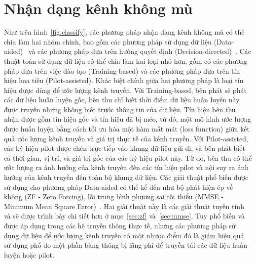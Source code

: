 \section{Nhận dạng kênh không mù}
Như trên hình~\ref{fig:classify}, các phương pháp nhận dạng kênh không mù có thể chia làm hai nhóm chính, bao gồm các phương pháp sử dụng dữ liệu (Data-aided)~\cite{vilas2022} và các phương pháp dựa trên hướng quyết định (Decision-directed)~\cite{Ozdemir2007}. Các thuật toán sử dụng dữ liệu có thể chia làm hai loại nhỏ hơn, gồm có các phương pháp dựa trên việc đào tạo (Training-based) và các phương pháp dựa trên tín hiệu hoa tiêu (Pilot-assisted). Khác biệt chính giữa hai phương pháp là loại tín hiệu được dùng để ước lượng kênh truyền. Với Training-based, bên phát sẽ phát các dữ liệu huấn luyện gốc, bên thu chỉ biết thời điểm dữ liệu huấn luyện này được truyền nhưng không biết trước thông tin của dữ liệu. Tín hiệu bên thu nhận được gồm tín hiệu gốc và tín hiệu đã bị méo, từ đó, một mô hình ước lượng được huấn luyện bằng cách tối ưu hóa một hàm mất mát (loss function) giữa kết quả ước lượng kênh truyền và giá trị thực tế của kênh truyền. Với Pilot-assisted, các ký hiệu pilot được chèn trực tiếp vào khung dữ liệu gửi đi, và bên phát biết cả thời gian, vị trí, và giá trị gốc của các ký hiệu pilot này. Từ đó, bên thu có thể ước lượng ra ảnh hưởng của kênh truyền đến các tín hiệu pilot và nội suy ra ảnh hưởng của kênh truyền đến toàn bộ khung dữ liệu. Các giải thuật phổ biến được sử dụng cho phương pháp Data-aided có thể kể đến như bộ phát hiện ép về không (ZF - Zero Forcing), lỗi trung bình phương sai tối thiểu (MMSE - Minimum Mean Square Error)~\cite{Jiang2011}. Hai giải thuật này là các giải thuật tuyến tính và sẽ được trình bày chi tiết hơn ở mục~\ref{sec:zf} và~\ref{sec:mmse}. Tuy phổ biến và được áp dụng trong các hệ truyền thông thực tế, nhưng các phương pháp sử dụng dữ liệu để ước lượng kênh truyền có một nhược điểm đó là giảm hiệu quả sử dụng phổ do một phần băng thông bị lãng phí để truyền tải các dữ liệu huấn luyện hoặc pilot. 

